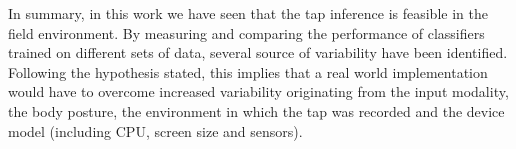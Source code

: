 In summary, in this work we have seen that the tap inference is feasible in the field environment. By measuring and comparing the performance of classifiers trained on different sets of data, several source of variability have been identified. Following the hypothesis stated, this implies that a real world implementation would have to overcome increased variability originating from the input modality, the body posture, the environment in which the tap was recorded and the device model (including CPU, screen size and sensors). 

